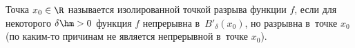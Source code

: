 
    Точка $x_0\in\R$ называется изолированной точкой разрыва функции $f$, если для некоторого $\delta\hm>0$ функция $f$  непрерывна в~$B'_\delta(x_0)$, но разрывна в~точке $x_0$ (по каким-то причинам не является непрерывной в~точке $x_0$).
